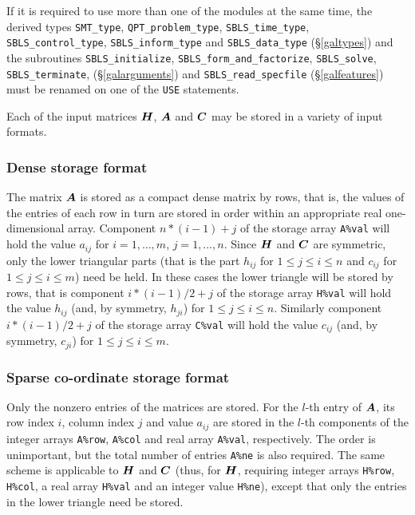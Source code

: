 \documentclass{galahad}
\newcommand{\packagename}{SBLS}
\begin{document}
\galhowto



\noindent
If it is required to use more than one of the modules at the same time, 
the derived types
{\tt SMT\_type},
{\tt QPT\_problem\_type},
{\tt \packagename\_time\_type},
{\tt \packagename\_control\_type},
{\tt \packagename\_inform\_type}
and
{\tt \packagename\_data\_type}
(\S\ref{galtypes})
and the subroutines
{\tt \packagename\_\-initialize},
{\tt \packagename\_\-form\_and\_factorize},
{\tt \packagename\_\-solve},
{\tt \packagename\_terminate},
(\S\ref{galarguments})
and
{\tt \packagename\_read\_specfile}
(\S\ref{galfeatures})
must be renamed on one of the {\tt USE} statements.


\galmatrix
Each of the input matrices ${\bm{H}}$, ${\bm{A}}$ and ${\bm{C}}$
may be stored in a variety of input formats.

\subsubsection{Dense storage format}\label{dense}
The matrix ${\bm{A}}$ is stored as a compact
dense matrix by rows, that is, the values of the entries of each row in turn are
stored in order within an appropriate real one-dimensional array.
Component $n \ast (i-1) + j$ of the storage array {\tt A\%val} will hold the
value $a_{ij}$ for $i = 1, \ldots , m$, $j = 1, \ldots , n$.
Since ${\bm{H}}$ and ${\bm{C}}$ are symmetric, only the lower triangular parts
(that is the part $h_{ij}$ for $1 \leq j \leq i \leq n$ and
$c_{ij}$ for $1 \leq j \leq i \leq m$) need be held. In these cases
the lower triangle will be stored by rows, that is
component $i \ast (i-1)/2 + j$ of the storage array {\tt H\%val}
will hold the value $h_{ij}$ (and, by symmetry, $h_{ji}$)
for $1 \leq j \leq i \leq n$. Similarly
component $i \ast (i-1)/2 + j$ of the storage array {\tt C\%val}
will hold the value $c_{ij}$ (and, by symmetry, $c_{ji}$)
for $1 \leq j \leq i \leq m$.

\subsubsection{Sparse co-ordinate storage format}\label{coordinate}
Only the nonzero entries of the matrices are stored. For the
$l$-th entry of ${\bm{A}}$, its row index $i$, column index $j$
and value $a_{ij}$
are stored in the $l$-th components of the integer arrays {\tt A\%row},
{\tt A\%col} and real array {\tt A\%val}, respectively.
The order is unimportant, but the total
number of entries {\tt A\%ne} is also required.
The same scheme is applicable to ${\bm{H}}$ and ${\bm{C}}$
(thus, for ${\bm{H}}$, requiring integer arrays {\tt H\%row}, {\tt H\%col}, a real
array  {\tt H\%val} and an integer value {\tt H\%ne}),
except that only the entries in the lower triangle need be stored.
\end{document}

